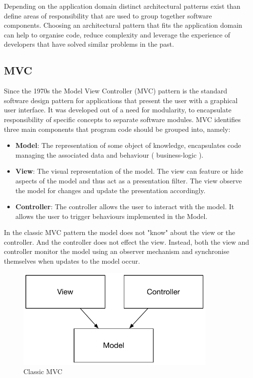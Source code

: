 Depending on the application domain distinct architectural patterns exist than define areas of responsibility that are used to group together software components. Choosing an architectural pattern that fits the application domain can help to organise code, reduce complexity and leverage the experience of developers that have solved similar problems in the past.

\subsection{MVC}
Since the 1970s the Model View Controller (MVC) pattern is the standard software design pattern for applications that present the user with a graphical user interface. It was developed out of a need for modularity, to encapsulate responsibility of specific concepts to separate software modules. MVC identifies three main components that program code should be grouped into, namely\cite{walther_2016}:

\begin{itemize}[label={}]

\item \textbf{Model}: The representation of some object of knowledge, encapsulates code managing the associated data and behaviour ( business-logic ).
\item \textbf{View}: The visual representation of the model. The view can feature or hide aspects of the model and thus act as a presentation filter. The view observe the model for changes and update the presentation accordingly.
\item \textbf{Controller}: The controller allows the user to interact with the model. It allows the user to trigger behaviours implemented in the Model.

\end{itemize}

In the classic MVC pattern the model does not "know" about the view or the controller. And the controller does not effect the view. Instead, both the view and controller monitor the model using an observer mechanism and synchronise themselves when updates to the model occur.

\begin{figure}[H]
    \centering
    \includegraphics[height=5cm,keepaspectratio]{assets/concept/mvc_1.pdf}
    \caption{Classic MVC}
    \label{fig:mvc_1}
\end{figure}


